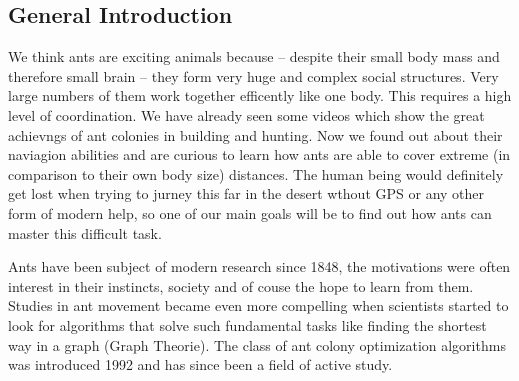 \documentclass[11pt]{article}
\begin{document}
\subsection{General Introduction}

We think ants are exciting animals because – despite their small body mass and therefore small brain – they form very huge and complex social structures. Very large numbers of them work together efficently like one body. This requires a high level of coordination. We have already seen some videos which show the great achievngs of ant colonies in building and hunting. Now we found out about their naviagion abilities and are curious to learn how ants are able to cover extreme (in comparison to their own body size) distances. The human being would definitely get lost when trying to jurney this far in the desert wthout GPS or any other form of modern help, so one of our main goals will be to find out how ants can master this difficult task.

Ants have been subject of modern research since 1848, the motivations were often interest in their instincts, society and of couse the hope to learn from them. Studies in ant movement became even more compelling when scientists started to look for algorithms that solve such fundamental tasks like finding the shortest way in a graph (Graph Theorie\cite{wiki1}). The class of ant colony optimization algorithms was introduced 1992 and has since been a field of active study\cite{wiki2}.
\end{document}
